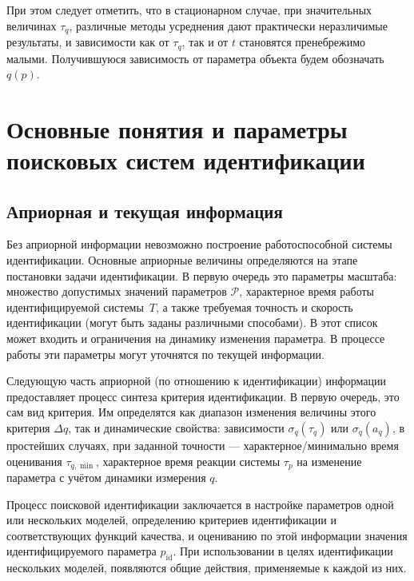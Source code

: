 При этом следует отметить, что в стационарном случае, при значительных величинах $\tau_q$,
различные методы усреднения дают практически неразличимые результаты, и зависимости
как от $\tau_q$, так и от $t$ становятся пренебрежимо малыми.
Получившуюся зависимость от параметра объекта будем обозначать $q(p)$.





\section{Основные понятия и параметры поисковых систем идентификации}  %

\subsection{Априорная и текущая информация}  %

Без априорной информации невозможно построение
работоспособной системы идентификации. Основные
априорные величины определяются на этапе постановки
задачи идентификации. В первую очередь это
параметры масштаба: множество допустимых
значений параметров \label{atu:d:p_set}\( \mathcal{P}\),
характерное время работы
идентифицируемой системы~$T$, а также
требуемая точность и скорость идентификации
(могут быть заданы различными способами).
В этот список может входить и ограничения на динамику изменения параметра.
В процессе работы эти параметры могут уточнятся по текущей информации.

Следующую часть априорной (по отношению к идентификации) информации
предоставляет процесс синтеза критерия идентификации.
В первую очередь, это сам вид критерия. Им определятся
как диапазон изменения величины этого критерия $\Delta q$, так и
динамические свойства:
зависимости $\sigma_q(\tau_q)$ или  $\sigma_q(a_q)$,
в простейших случаях, при заданной точности --- характерное/минимально время
оценивания \(\tau_{q,\min}\),
характерное время реакции системы $\tau_p$ на изменение
параметра с учётом динамики измерения \(q\).

Процесс поисковой идентификации заключается в настройке параметров одной
или нескольких моделей, определению критериев идентификации
и соответствующих функций качества, и оцениванию по этой информации
значения идентифицируемого параметра \label{atu:d:p_id}$p_\mathrm{id}$.
При использовании в целях идентификации нескольких моделей,
появляются общие действия, применяемые к каждой из них.

